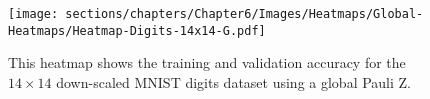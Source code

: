 \begin{figure}[h]
    \centering
    \texttt{[image: sections/chapters/Chapter6/Images/Heatmaps/Global-Heatmaps/Heatmap-Digits-14x14-G.pdf]}
    \caption{This heatmap shows the training and validation accuracy for the $14\times14$ 
    down-scaled MNIST digits dataset using a global Pauli Z.}
    \label{fig:heatmap-14x14-G}
\end{figure}